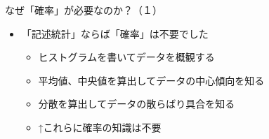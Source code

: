 \documentclass[dvipdfmx,cjk]{beamer}
\begin{document}
\begin{frame}{なぜ「確率」が必要なのか？（１）}


\begin{itemize}

    \item 「記述統計」ならば「確率」は不要でした
        \begin{itemize}
        \item ヒストグラムを書いてデータを概観する
        \item 平均値、中央値を算出してデータの中心傾向を知る
        \item 分散を算出してデータの散らばり具合を知る
        \item ↑これらに確率の知識は不要
        \end{itemize}

\end{itemize}

\end{frame}
\end{document}
